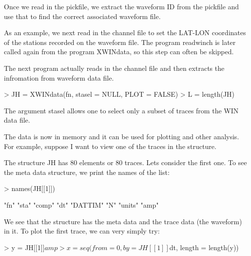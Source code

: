 \documentclass{article}
\begin{document}
Once we read in the pickfile, we extract the 
waveform ID  from the pickfile and
use that to find the correct associated
waveform file.

As an example, we next read in the channel file
to set the LAT-LON coordinates of the stations
recorded on the waveform file.  The program readwinch
is later called again from the program XWINdata,
so this step can often be skipped.


\begin{Schunk}
\end{Schunk}

The next program actually reads in the channel file and then extracts the infromation 
from waveform data file.

\begin{Schunk}
\begin{Sinput}
> JH = XWINdata(fn, stasel = NULL, PLOT = FALSE)
> L = length(JH)
\end{Sinput}
\end{Schunk}

The argument stasel  allows one to select only a subset of traces from the 
WIN data file.

The data is now in memory and it can be used for plotting and other analysis.
For example, suppose I want to view one of the 
traces in the structure.

The structure JH has 80 elements or 80 traces.
Lets consider the first one.  To see the meta data structure,
we print the names of the list:

\begin{Schunk}
\begin{Sinput}
> names(JH[[1]])
\end{Sinput}
\begin{Soutput}
[1] "fn"     "sta"    "comp"   "dt"     "DATTIM" "N"      "units"  "amp"   
\end{Soutput}
\end{Schunk}

We see that the  structure has the meta data and the trace data (the waveform)
in it.
To plot the first trace, we can very simply try:

\begin{Schunk}
\begin{Sinput}
> y = JH[[1]]$amp
> x = seq(from = 0, by = JH[[1]]$dt, length = length(y))
\end{Sinput}
\end{Schunk}
\end{document}
